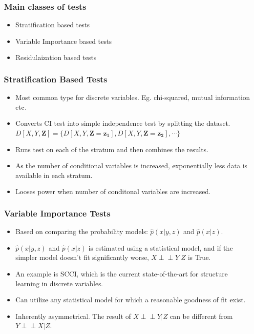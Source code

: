\documentclass{beamer}
\def\ci{\perp\!\!\!\!\!\perp}
\begin{document}
\begin{frame}
	\frametitle{Main classes of tests}
	\begin{itemize}
		\setlength\itemsep{1em}
		\item Stratification based tests
		\item Variable Importance based tests
		\item Residulaization based tests
	\end{itemize}
\end{frame}

\begin{frame}
	\frametitle{Stratification Based Tests}
	\begin{itemize}
		\setlength\itemsep{1em}
		\item Most common type for discrete variables. Eg. chi-squared,
			mutual information etc. 
		\item Converts CI test into simple independence test by splitting 
			the dataset.
		$ D[X, Y, \bm{Z}] = \{ D[X, Y, \bm{Z}=\bm{z_1}], D[X, Y, \bm{Z}=\bm{z_2}], \cdots \} $	
		\item Runs test on each of the stratum and then combines the results.
		\item As the number of conditional variables is increased, exponentially
			less data is available in each stratum.
		\item Looses power when number of conditonal variables
			are increased.
	\end{itemize}
\end{frame}

\begin{frame}
	\frametitle{Variable Importance Tests}
	\begin{itemize}
		\setlength\itemsep{1em}
		\item Based on comparing the probability models: $\hat{p}(x | y, z) $ 
			and $ \hat{p}(x | z) $.
		\item $ \hat{p}(x|y, z) $ and $ \hat{p}(x | z) $ is estimated using a
			statistical model, and if the simpler model doesn't fit
			significantly worse, $ X \ci Y | Z $ is True.
		\item An example is SCCI, which is the current state-of-the-art
			for structure learning in discrete variables.
		\item Can utilize any statistical model for which a reasonable goodness
			of fit exist.
		\item Inherently asymmetrical. The result of $ X \ci Y | Z $
			can be different from $ Y \ci X | Z $.
	\end{itemize}

\end{frame}
\end{document}
